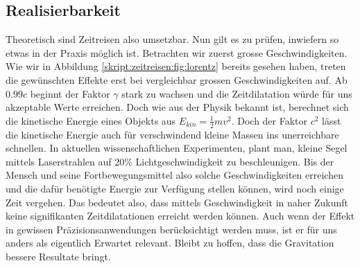 \begin{refsection}
	\section{Realisierbarkeit}
    
    Theoretisch sind Zeitreisen also umsetzbar. Nun gilt es zu prüfen, inwiefern so etwas in der Praxis möglich ist. Betrachten wir zuerst grosse Geschwindigkeiten. Wie wir in Abbildung \ref{skript:zeitreisen:fig:lorentz} bereits gesehen haben, treten die gewünschten Effekte erst bei vergleichbar grossen Geschwindigkeiten auf. Ab $0.99c$ beginnt der Faktor  $\gamma$ stark zu wachsen und die Zeitdilatation würde für uns akzeptable Werte erreichen.
    Doch wie aus der Physik bekannt ist, berechnet sich die kinetische Energie eines Objekts aus $E_{kin}=\frac{1}{2}mv^2$. Doch der Faktor $c^2$ lässt die kinetische Energie auch für verschwindend kleine Massen ins unerreichbare schnellen.
    In aktuellen wissenschaftlichen Experimenten, plant man, kleine Segel mittels Laserstrahlen auf 20\% Lichtgeschwindigkeit zu beschleunigen. Bis der Mensch und seine Fortbewegungsmittel also solche Geschwindigkeiten erreichen und die dafür benötigte Energie zur Verfügung stellen können, wird noch einige Zeit vergehen.
    Das bedeutet also, dass mittels Geschwindigkeit in naher Zukunft keine signifikanten Zeitdilatationen erreicht werden können. Auch wenn der Effekt in gewissen Präzisionsanwendungen berücksichtigt werden muss, ist er für uns anders als eigentlich Erwartet relevant. Bleibt zu hoffen, dass die Gravitation bessere Resultate bringt. 
    

\end{refsection}
